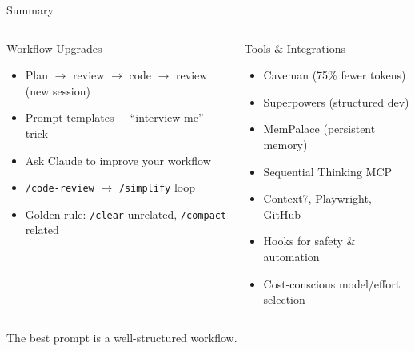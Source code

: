 \documentclass[aspectratio=169]{beamer}
\begin{document}
\begin{frame}{Summary}
\begin{columns}[T]
\begin{block}{Workflow Upgrades}
\begin{itemize}
  \item Plan $\to$ review $\to$ code $\to$ review (new session)
  \item Prompt templates + ``interview me'' trick
  \item Ask Claude to improve your workflow
  \item \texttt{/code-review} $\to$ \texttt{/simplify} loop
  \item Golden rule: \texttt{/clear} unrelated, \texttt{/compact} related
\end{itemize}
\end{block}

\begin{block}{Tools \& Integrations}
\begin{itemize}
  \item Caveman (75\% fewer tokens)
  \item Superpowers (structured dev)
  \item MemPalace (persistent memory)
  \item Sequential Thinking MCP
  \item Context7, Playwright, GitHub
  \item Hooks for safety \& automation
  \item Cost-conscious model/effort selection
\end{itemize}
\end{block}
\end{columns}

\vfill
\centering
{\Large\color{popblue} The best prompt is a well-structured workflow.}
\end{frame}
\end{document}
